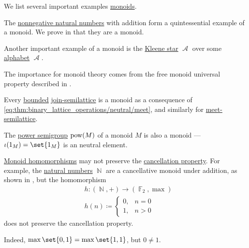 \begin{example}\label{ex:def:monoid}
  We list several important examples \hyperref[def:monoid]{monoids}.

  \begin{thmenum}
     The \hyperref[def:natural_numbers]{nonnegative natural numbers} with addition form a quintessential example of a monoid. We prove in  that they are a monoid.

     Another important example of a monoid is the \hyperref[def:formal_language/kleene_star]{Kleene star} \( \mscrA \) over some \hyperref[def:formal_language]{alphabet} \( \mscrA \).

    The importance for monoid theory comes from the free monoid universal property described in .

     Every \hyperref[def:semilattice/bounded]{bounded} \hyperref[def:semilattice/join]{join-semilattice} is a monoid as a consequence of \eqref{eq:thm:binary_lattice_operations/neutral/meet}, and similarly for \hyperref[def:semilattice/meet]{meet-semilattice}.

     The \hyperref[def:power_semigroup]{power semigroup} \( \operatorname{pow}(M) \) of a monoid \( M \) is also a monoid --- \( \iota(1_M) = \set{ 1_M } \) is an neutral element.
  \end{thmenum}
\end{example}

\begin{example}\label{ex:monoid_cancellation_not_preserved_by_homomorphism}
  \hyperref[def:monoid/homomorphism]{Monoid homomorphisms} may not preserve the \hyperref[def:binary_operation/cancellative]{cancellation property}. For example, the \hyperref[def:natural_numbers]{natural numbers} \( \BbbN \) are a cancellative monoid under addition, as shown in , but the homomorphism
  \begin{equation*}
    \begin{aligned}
      &h: (\BbbN, +) \to (\BbbF_2, \max) \\
      &h(n) \coloneqq \begin{cases}
        0, &n = 0 \\
        1, &n > 0
      \end{cases}
    \end{aligned}
  \end{equation*}
  does not preserve the cancellation property.

  Indeed, \( \max\set{ 0, 1 } = \max\set{ 1, 1 } \), but \( 0 \neq 1 \).
\end{example}

